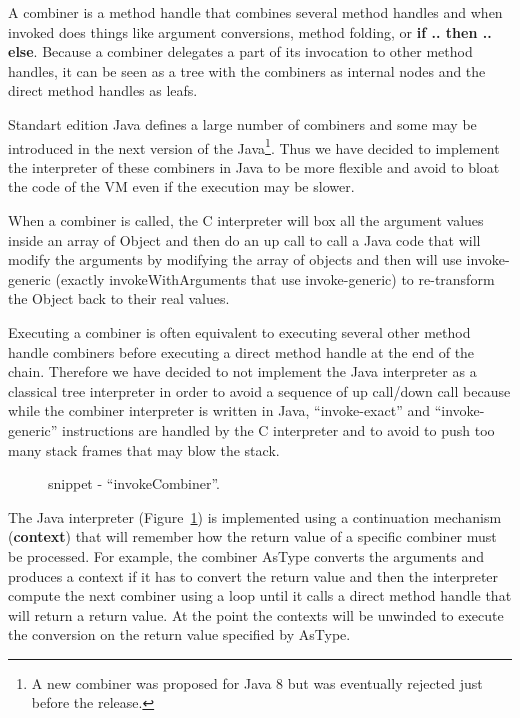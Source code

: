 \documentclass{sig-alternate}
\begin{document}
      A combiner is a method handle that combines several method handles and when invoked
      does things like argument conversions, method folding, or {\bf if .. then .. else}.
      Because a combiner delegates a part of its invocation to other method handles,
      it can be seen as a tree with the combiners as internal nodes and the direct
      method handles as leafs.

      Standart edition Java defines a large number of combiners and some may be introduced in the next version
      of the Java\footnote{A new combiner was proposed for Java 8 but was eventually rejected just before the release.}.
      Thus we have decided to implement the interpreter of these combiners in Java
      to be more flexible and avoid to bloat the code of the VM even if the execution may be slower.
      
      When a combiner is called, the C interpreter will box all the argument values inside an array of Object
      and then do an up call to call a Java code that will modify the arguments by modifying the array
      of objects and then will use invoke-generic (exactly invokeWithArguments that use invoke-generic)
      to re-transform the Object back to their real values.  

      Executing a combiner is often equivalent to executing several other method handle
      combiners before executing a direct method handle at the end of the chain.
      Therefore we have decided to not implement the Java interpreter as a classical
      tree interpreter in order to avoid a sequence of up call/down call because while
      the combiner interpreter is written in Java, ``invoke-exact'' and ``invoke-generic'' instructions
      are handled by the C interpreter and to avoid to push too many stack frames that may blow the stack.
      
      \begin{figure}[!h]
        \centering \vspace{-1em}
        \caption{snippet - ``invokeCombiner''.}
        \label{implINTERP}
      \end{figure}

      The Java interpreter (Figure~\ref{implINTERP}) is implemented using a continuation mechanism
      ({\bf context}) that will remember how the return value of a specific combiner must be processed.
      For example, the combiner AsType converts the arguments and produces a context if it has
      to convert the return value and then the interpreter compute the next combiner using a loop until it calls
      a direct method handle that will return a return value. At the point the contexts will be unwinded
      to execute the conversion on the return value specified by AsType. 
\end{document}

